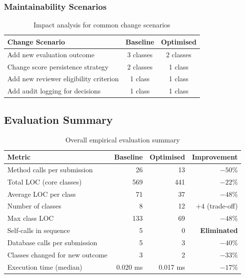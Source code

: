 \documentclass[12pt, a4paper]{article}
\begin{document}
\subsubsection{Maintainability Scenarios}

\begin{table}[h]
\centering
\caption{Impact analysis for common change scenarios}
\label{tab:maintainability}
\begin{tabularx}{\textwidth}{X c c}
    \toprule
    \textbf{Change Scenario} & \textbf{Baseline} & \textbf{Optimised} \\
    \midrule
    Add new evaluation outcome & 3 classes & 2 classes \\
    Change score persistence strategy & 2 classes & 1 class \\
    Add new reviewer eligibility criterion & 1 class & 1 class \\
    Add audit logging for decisions & 1 class & 1 class \\
    \bottomrule
\end{tabularx}
\end{table}

\subsection{Evaluation Summary}

\begin{table}[h]
\centering
\caption{Overall empirical evaluation summary}
\label{tab:eval-summary}
\begin{tabular}{l r r r}
    \toprule
    \textbf{Metric} & \textbf{Baseline} & \textbf{Optimised} & \textbf{Improvement} \\
    \midrule
    Method calls per submission & 26 & 13 & \textbf{$-50\%$} \\
    Total LOC (core classes) & 569 & 441 & \textbf{$-22\%$} \\
    Average LOC per class & 71 & 37 & \textbf{$-48\%$} \\
    Number of classes & 8 & 12 & $+4$ (trade-off) \\
    Max class LOC & 133 & 69 & \textbf{$-48\%$} \\
    Self-calls in sequence & 5 & 0 & \textbf{Eliminated} \\
    Database calls per submission & 5 & 3 & \textbf{$-40\%$} \\
    Classes changed for new outcome & 3 & 2 & \textbf{$-33\%$} \\
    Execution time (median) & 0.020 ms & 0.017 ms & \textbf{$-17\%$} \\
    \bottomrule
\end{tabular}
\end{table}
\end{document}
